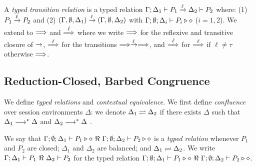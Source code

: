\begin{definition}\label{d:tlts}\rm
A {\em typed transition relation} is a typed relation
$\Gamma; \Delta_1 \vdash P_1 \xrightarrow{\ell} \Delta_2 \vdash P_2$
	where:
%
(1) $P_1 \xrightarrow{\ell} P_2$ and (2) 
$(\Gamma, \emptyset, \Delta_1) \xrightarrow{\ell} (\Gamma, \emptyset, \Delta_2)$ 
with $\Gamma; \emptyset; \Delta_i \vdash P_i \triangleright \diamond$ 
($i=1,2$).
%
%
We extend to $\stackrel{}{\Longrightarrow}$ 
and $\stackrel{\hat{\ell}}{\Longrightarrow}$ 
where we write 
$\stackrel{}{\Longrightarrow}$ for the reflexive and
transitive closure of $\xrightarrow{}$, $\stackrel{\ell}{\Longrightarrow}$ for the transitions
$\stackrel{}{\Longrightarrow}\xrightarrow{\ell}\stackrel{}{\Longrightarrow}$, and $\stackrel{\hat{\ell}}{\Longrightarrow}$ for $\stackrel{\ell}{\Longrightarrow}$ if
$\ell\not = \tau$ otherwise $\stackrel{}{\Longrightarrow}$. 
\end{definition}

\subsection{Reduction-Closed, Barbed Congruence}
\label{subsec:rc}
\noi We define \emph{typed relations} and \emph{contextual equivalence}.  
We first define \emph{confluence}
over session environments $\Delta$:
we denote $\Delta_1 \rightleftharpoons \Delta_2$ if there exists $\Delta$ such that
	$\Delta_1 \longrightarrow^\ast \Delta$ and $\Delta_2 \longrightarrow^\ast \Delta$
	.

\smallskip 

\begin{definition}\rm %
	We say that
	$\Gamma; \emptyset; \Delta_1 \vdash P_1 \triangleright \diamond\ \Re \ \Gamma; \emptyset; \Delta_2 \vdash P_2 \triangleright \diamond$
	is a {\em typed relation} whenever $P_1$ and $P_2$ are closed;
		$\Delta_1$ and $\Delta_2$ are balanced; and 
		$\Delta_1 \rightleftharpoons \Delta_2$.
We write
$\horel{\Gamma}{\Delta_1}{P_1}{\ \Re \ }{\Delta_2}{P_2}$
for the typed relation $\Gamma; \emptyset; \Delta_1 \vdash P_1 \triangleright \diamond\ \Re \ \Gamma; \emptyset; \Delta_2 \vdash P_2 \triangleright \diamond$.
\end{definition}

